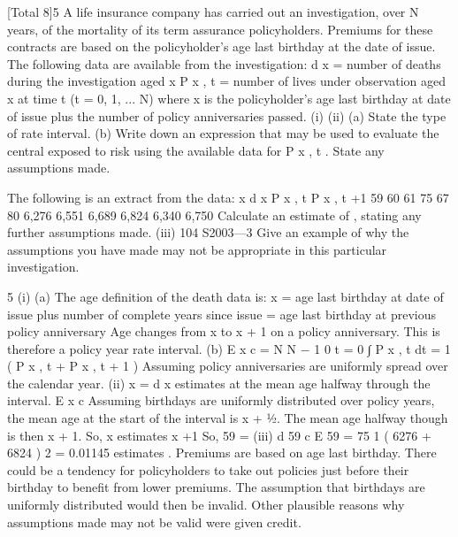 \documentclass[a4paper,12pt]{article}
\begin{document}
[Total 8]5
A life insurance company has carried out an investigation, over N years, of the
mortality of its term assurance policyholders. Premiums for these contracts are based
on the policyholder’s age last birthday at the date of issue.
The following data are available from the investigation:
d x
= number of deaths during the investigation aged x
P x , t = number of lives under observation aged x at time t (t = 0, 1, ... N)
where x is the policyholder’s age last birthday at date of issue plus the number of
policy anniversaries passed.
(i)
(ii)
(a) State the type of rate interval.
(b) Write down an expression that may be used to evaluate the central
exposed to risk using the available data for P x , t . State any assumptions
made.

The following is an extract from the data:
x d x P x , t P x , t +1
59
60
61 75
67
80 6,276
6,551
6,689 6,824
6,340
6,750
Calculate an estimate of  , stating any further assumptions made.
(iii)
104 S2003—3
Give an example of why the assumptions you have made may not be
appropriate in this particular investigation.


5
(i)
(a)
The age definition of the death data is:
x = age last birthday at date of issue plus number of complete years
since issue
= age last birthday at previous policy anniversary
Age changes from x to x + 1 on a policy anniversary.
This is therefore a policy year rate interval.
(b)
E x c =
N N − 1
0 t = 0
∫ P x , t dt =
1
 ( P x , t + P x , t + 1 )
Assuming policy anniversaries are uniformly spread over the calendar
year.
(ii)
\hat{\mu} x =
d x
estimates \mu at the mean age halfway through the interval.
E x c
Assuming birthdays are uniformly distributed over policy years,
the mean age at the start of the interval is x + 1⁄2.
The mean age halfway though is then x + 1.
So, \hat{\mu} x estimates \mu x +1
So, \hat{\mu} 59 =
(iii)
d 59
c
E 59
=
75
1
( 6276 + 6824 )
2
= 0.01145 estimates  .
Premiums are based on age last birthday. There could be a tendency for
policyholders to take out policies just before their birthday to benefit from
lower premiums. The assumption that birthdays are uniformly distributed
would then be invalid.
Other plausible reasons why assumptions made may not be valid were given
credit.
\end{document}
